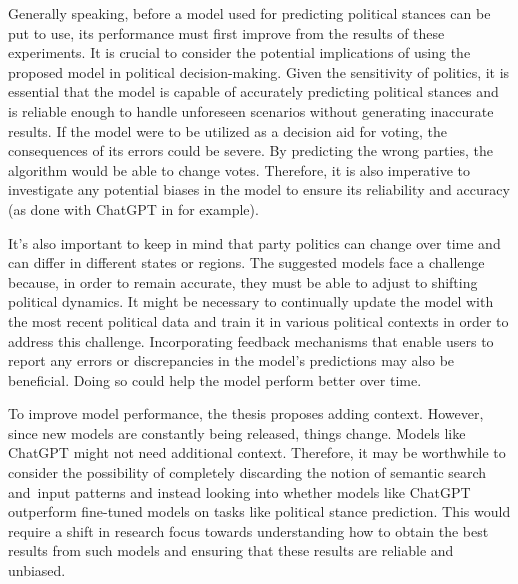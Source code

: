 Generally speaking, before a model used for predicting political stances can be put to use, its performance must first improve from the results of these experiments. It is crucial to consider the potential implications of using the proposed model in political decision-making. Given the sensitivity of politics, it is essential that the model is capable of accurately predicting political stances and is reliable enough to handle unforeseen scenarios without generating inaccurate results. If the model were to be utilized as a decision aid for voting, the consequences of its errors could be severe. By predicting the wrong parties, the algorithm would be able to change votes. Therefore, it is also imperative to investigate any potential biases in the model to ensure its reliability and accuracy (as done with ChatGPT in \citet{hartmann2023political} for example).

It's also important to keep in mind that party politics can change over time and can differ in different states or regions. The suggested models face a challenge because, in order to remain accurate, they must be able to adjust to shifting political dynamics. It might be necessary to continually update the model with the most recent political data and train it in various political contexts in order to address this challenge. Incorporating feedback mechanisms that enable users to report any errors or discrepancies in the model's predictions may also be beneficial. Doing so could help the model perform better over time.

To improve model performance, the thesis proposes adding context. However, since new models are constantly being released, things change. Models like ChatGPT \citep{chatgpt} might not need additional context. Therefore, it may be worthwhile to consider the possibility of completely discarding the notion of semantic search and input patterns and instead looking into whether models like ChatGPT \citep{chatgpt} outperform fine-tuned models on tasks like political stance prediction. This would require a shift in research focus towards understanding how to obtain the best results from such models and ensuring that these results are reliable and unbiased.